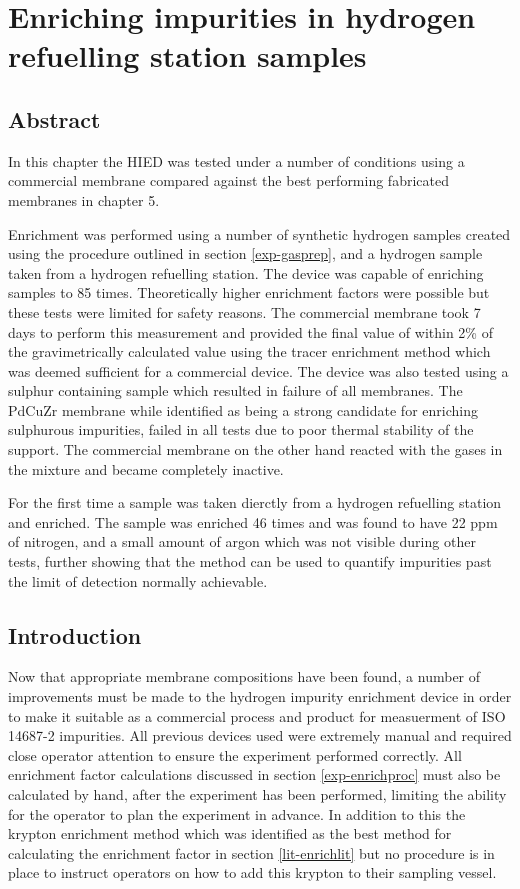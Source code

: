 \chapter{Enriching impurities in hydrogen refuelling station samples}

\section*{Abstract}
In this chapter the HIED  was tested under a number of conditions using a commercial membrane compared against the best performing fabricated membranes in chapter 5. 

Enrichment was performed using a number of synthetic hydrogen samples created using the procedure outlined in section \ref{exp-gasprep}, and a hydrogen sample taken from a hydrogen refuelling station. The device was capable of enriching samples to 85 times. Theoretically higher enrichment factors were possible but these tests were limited for safety reasons. The commercial membrane took 7 days to perform this measurement and provided the final value of within 2\% of the gravimetrically calculated value using the tracer enrichment method which was deemed sufficient for a commercial device. The device was also tested using a sulphur containing sample which resulted in failure of all membranes. The PdCuZr membrane while identified as being a strong candidate for enriching sulphurous impurities, failed in all tests due to poor thermal stability of the support. The commercial membrane on the other hand reacted with the gases in the mixture and became completely inactive. 

For the first time a sample was taken dierctly from a hydrogen refuelling station and enriched. The sample was enriched 46 times and was found to have 22 ppm of nitrogen, and a small amount of argon which was not visible during other tests, further showing that the method can be used to quantify impurities past the limit of detection normally achievable.   

\section{Introduction}
Now that appropriate membrane compositions have been found, a number of improvements must be made to the hydrogen impurity enrichment device in order to make it suitable as a commercial process and product for measuerment of ISO 14687-2 impurities. All previous devices used were extremely manual and required close operator attention to ensure the experiment performed correctly. All enrichment factor calculations discussed in section \ref{exp-enrichproc} must also be calculated by hand, after the experiment has been performed, limiting the ability for the operator to plan the experiment in advance. In addition to this the krypton enrichment method which was identified as the best method for calculating the enrichment factor in section \ref{lit-enrichlit} but no procedure is in place to instruct operators on how to add this krypton to their sampling vessel. 

